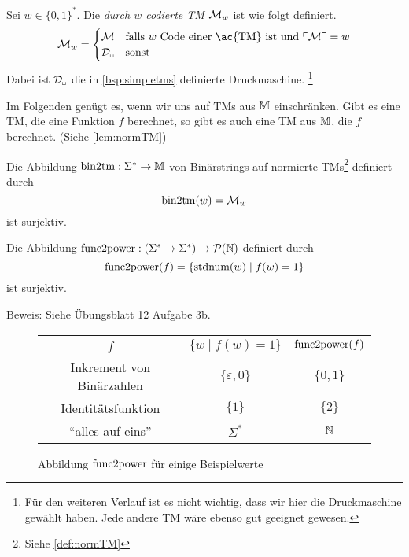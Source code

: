 \begin{Def}[name={[Durch Binärstring codierte \ac{TM}]}]
	Sei $w\in\{0,1\}^*$.
	Die \emph{durch $w$ codierte \ac{TM}} $\mathcal{M}_w$ ist wie folgt definiert.
	$$\M_w=\begin{cases}
		\M & \text{falls } w \text{ Code einer \ac{TM} ist und } \godel{\M}=w\\
		\D_\mblank & \text{sonst}
	\end{cases}$$
	Dabei ist $\D_\mblank$ die in \autoref{bsp:simpletms} definierte Druckmaschine.%
	\footnote{Für den weiteren Verlauf ist es nicht wichtig, dass wir hier die Druckmaschine gewählt haben. Jede andere \ac{TM} wäre ebenso gut geeignet gewesen.}
\end{Def}


\begin{Bemerkung}
	Im Folgenden genügt es, wenn wir uns auf \ac{TM}s aus $\mathbb{M}$ einschränken.
	Gibt es eine \ac{TM}, die eine Funktion $f$ berechnet, so gibt es auch eine \ac{TM} aus $\mathbb{M}$, die $f$ berechnet.
	(Siehe \autoref{lem:normTM})
\end{Bemerkung}


\begin{lemma}[name={[$\bintotm$]}]\label{satz:bintotm}
	Die Abbildung $\operatorname{bin2tm}: \Sigma^*\rightarrow \mathbb{M}$ von Binärstrings auf normierte \acp{TM}\footnote{Siehe \autoref{def:normTM}} 
	definiert durch
	$$ \operatorname{bin2tm}(w)=\mathcal{M}_w$$
	ist surjektiv.
\end{lemma}


\begin{lemma}[name={[$\functopower$]}]\label{satz:functopower}
	Die Abbildung $\operatorname{func2power}:(\Sigma^*\rightarrow\Sigma^*)\rightarrow \mathcal{P}(\mathbb{N})$
	definiert durch
	$$\operatorname{func2power}(f)=\{\operatorname{stdnum}(w)\mid f(w)=1\}$$
	ist surjektiv.
\end{lemma}
Beweis: Siehe Übungsblatt 12 Aufgabe 3b.


\begin{figure}[H]\centering
	\begin{tabular}{ccc}
		$f$ & $\{w\mid f(w)=1\}$ & $\operatorname{func2power}(f)$\\ \hline
		Inkrement von Binärzahlen & $\{\varepsilon, 0\}$ & $\{0,1\}$\\
		Identitätsfunktion & $\{1\}$ & $\{2\}$\\
		"`alles auf eins"' & $\Sigma^*$ & $\mathbb{N}$
	\end{tabular}
	
	\caption{Abbildung $\functopower$ für einige Beispielwerte}
\end{figure}


